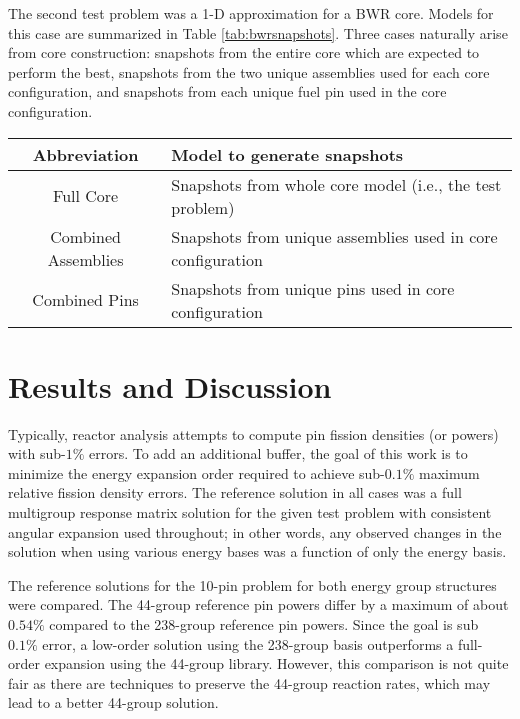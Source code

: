 \documentclass[5p,times,twocolumn,10pt]{elsarticle}
\begin{document}
    The second test problem was a 1-D approximation for a BWR core.  Models for 
    this case are summarized in Table \ref{tab:bwrsnapshots}.  Three cases 
    naturally arise from core construction: snapshots from the entire core 
which 
    are expected to perform the best, snapshots from the two unique assemblies 
    used for each core configuration, and snapshots from each unique fuel pin 
    used in the core configuration.  
    
    \begin{table*}[htb]
        \centering
        \caption{Summary of models used for snapshot generation for BWR test 
            case}
        \begin{tabular}{c | l}\toprule
            Abbreviation         & Model to generate snapshots \\ \midrule
            Full Core            & Snapshots from whole core model (i.e., the 
            test problem) \\
            Combined Assemblies  & Snapshots from unique assemblies used in 
core 
            configuration \\
            Combined Pins        & Snapshots from unique pins used in core 
            configuration \\
            \bottomrule
        \end{tabular}
        \label{tab:bwrsnapshots}
    \end{table*}
    
    \section{Results and Discussion}
    \label{sec:results}
    
    Typically, reactor analysis attempts to compute pin fission densities (or 
    powers) with sub-$1\%$ errors.  To add an additional buffer, the goal of 
    this work is to minimize the energy expansion order required to achieve 
    sub-$0.1\%$ maximum relative fission density errors. The reference solution 
    in all cases was a full multigroup response matrix solution for the given 
    test problem with consistent angular expansion used throughout; in other 
    words, any observed changes in the solution when using various energy bases 
    was a function of only the energy basis.
    
    The reference solutions for the 10-pin problem for both energy group 
    structures 
    were compared.  The 44-group reference pin powers differ by a maximum 
    of about $0.54\%$ compared to the 238-group reference pin powers.  
    Since the goal is sub $0.1\%$ error, a low-order solution using the 
    238-group basis outperforms a full-order expansion using the 44-group 
    library.  However, this comparison is not quite fair as there are techniques 
    to preserve the 44-group reaction rates, which may lead to a better 
    44-group solution.  
    
\end{document}
